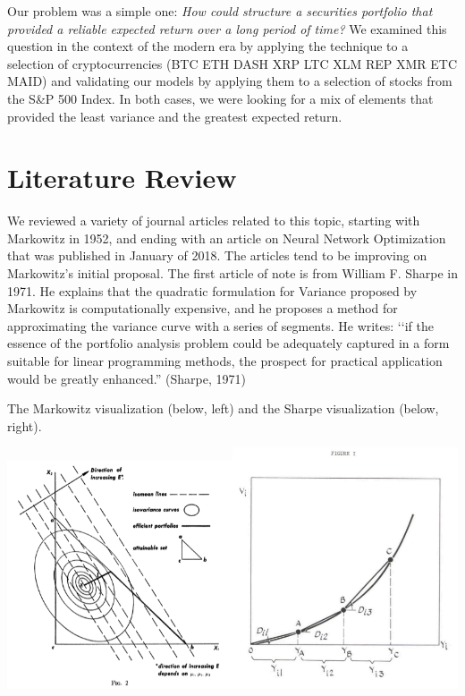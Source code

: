 \documentclass[12pt]{article} %
\begin{document}
Our problem was a simple one:\emph{ How could structure a securities portfolio that provided a reliable expected return over a long period of time?} We examined this question in the context of the modern era by applying the technique to a selection of cryptocurrencies (BTC ETH DASH XRP LTC XLM REP XMR ETC MAID) and validating our models by applying them to a selection of stocks from the S\&P 500 Index. In both cases, we were looking for a mix of elements that provided the least variance and the greatest expected return. 

\section{Literature Review}

We reviewed a variety of journal articles related to this topic, starting with Markowitz in 1952, and ending with an article on Neural Network Optimization that was published in January of 2018. The articles tend to be improving on Markowitz’s initial proposal. The first article of note is from William F. Sharpe in 1971. He explains that the quadratic formulation for Variance proposed by Markowitz is computationally expensive, and he proposes a method for approximating the variance curve with a series of segments. He writes: ‘‘if the essence of the portfolio analysis problem could be adequately captured in a form suitable for linear programming methods, the prospect for practical application would be greatly enhanced.” (Sharpe, 1971)

The Markowitz visualization (below, left) and the Sharpe visualization (below, right).

\includegraphics[width=0.5\textwidth]{mark1}\includegraphics[width=0.5\textwidth]{sharpe1}
    
\end{document}
